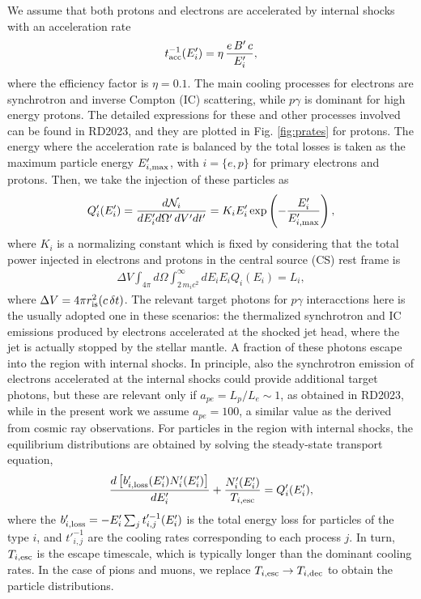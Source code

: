\documentclass[baaa]{baaa}
\newcommand{\be}{\begin{eqnarray}}
\newcommand{\ee}{\end{eqnarray}}
\begin{document}
We assume that both protons and electrons are accelerated by internal shocks with an acceleration rate
\be
t_{\rm acc}^{-1}(E'_i)=\eta\,\frac{  e\, B' \,c}{E'_i},
\ee 
where the efficiency factor is $\eta=0.1$. The main cooling processes for electrons are synchrotron and inverse Compton (IC) scattering, while $p\gamma$ is dominant for high energy protons. The detailed expressions for these and other processes involved can be found in RD2023, and they are plotted in Fig. \ref{fig:prates} for protons. The energy where the acceleration rate is balanced by the total losses is taken as the maximum particle energy $E'_{i,\rm max}$, with $i=\{e,p\}$ for primary electrons and protons. 
Then, we take the injection of these particles as
\be 
Q'_i(E'_i)= \frac{d\mathcal{N}_i}{dE'_i d\Omega'\,dV'dt'}=K_iE'_i \exp\left(-\frac{E'_i}{E'_{i,\rm max}}\right),
\ee
where $K_i$ is a normalizing constant which is fixed by considering that the total power injected in electrons and protons in the central source (CS) rest frame {is}
\be
\Delta V \int_{4\pi}d\Omega \int_{2\,m_i c^2}^{\infty}dE_i E_iQ_i(E_i)= L_i, 
\ee
where $\Delta V=4\pi r_{\rm is}^2(c\,\delta t)$. {The relevant target photons for $p\gamma$ interacctions here is the usually adopted one in these scenarios: the thermalized synchrotron and IC emissions produced by electrons accelerated at the shocked jet head, where the jet is actually stopped by the stellar mantle. A fraction of these photons escape into the region with internal shocks. In principle, also the synchrotron emission of electrons accelerated at the internal shocks could provide additional target photons, but these are relevant only if $a_{pe}=L_p/L_e\sim 1$, as obtained in RD2023, while in the present work we assume $a_{pe}=100$, a similar value as the derived from cosmic ray observations.
%
For particles in the region with internal shocks,} the equilibrium distributions are obtained by solving the steady-state transport equation,
\be
\frac{d\left[b'_{i,\rm loss}(E'_i) N'_i(E'_i)\right]}{dE'_i}+  \frac{N'_i(E'_i)}{T_{i,\rm esc}}= Q'_i(E'_i),\label{Eq_transport_i}  
\ee
where the $b'_{i,\rm loss}=- E'_i \sum_j t'^{-1}_{i,j}(E'_{i})$ is the total energy loss for particles of the type $i$, and $t'^{-1}_{i,j}$ are the cooling rates corresponding to each process $j$. In turn, $T_{i,\rm esc}$ is the escape timescale, which is typically longer than the dominant cooling rates. In the case of pions and muons, we replace $T_{i,\rm esc}\rightarrow T_{i,\rm dec}$ to obtain the particle distributions. 
%
\end{document}
